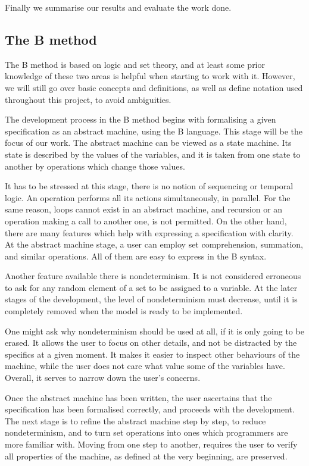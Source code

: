 \documentclass[12pt,journal,duplex]{IEEEtran}
\begin{document}
	Finally we summarise our results and evaluate the work done.

	\subsection{The B method}
	The B method is based on logic and set theory, and at least some prior knowledge of these two areas is helpful when starting to work with it. However, we will still go over basic concepts and definitions, as well as define notation used throughout this project, to avoid ambiguities.

	The development process in the B method begins with formalising a given specification as an abstract machine, using the B language. This stage will be the focus of our work. The abstract machine can be viewed as a state machine. Its state is described by the values of the variables, and it is taken from one state to another by operations which change those values.

	It has to be stressed at this stage, there is no notion of sequencing or temporal logic. An operation performs all its actions simultaneously, in parallel. For the same reason, loops cannot exist in an abstract machine, and recursion or an operation making a call to another one, is not permitted. On the other hand, there are many features which help with expressing a specification with clarity. At the abstract machine stage, a user can employ set comprehension, summation, and similar operations. All of them are easy to express in the B syntax.

	Another feature available there is nondeterminism. It is not considered erroneous to ask for any random element of a set to be assigned to a variable. At the later stages of the development, the level of nondeterminism must decrease, until it is completely removed when the model is ready to be implemented.

	One might ask why nondeterminism should be used at all, if it is only going to be erased. It allows the user to focus on other details, and not be distracted by the specifics at a given moment. It makes it easier to inspect other behaviours of the machine, while the user does not care what value some of the variables have. Overall, it serves to narrow down the user's concerns.

	Once the abstract machine has been written, the user ascertains that the specification has been formalised correctly, and proceeds with the development. The next stage is to refine the abstract machine step by step, to reduce nondeterminism, and to turn set operations into ones which programmers are more familiar with. Moving from one step to another, requires the user to verify all properties of the machine, as defined at the very beginning, are preserved.
\end{document}
